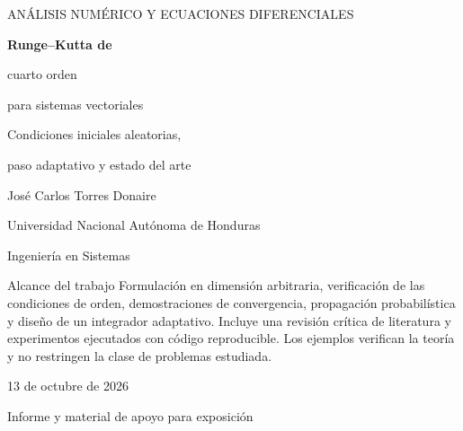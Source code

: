 \documentclass[11pt,a4paper]{article}
\theoremstyle{definition}\newtheorem{definition}[theorem]{Definición}
\theoremstyle{remark}\newtheorem{remark}[theorem]{Observación}
\begin{document}
\begin{titlepage}
\vspace*{1.2cm}
{\color{teal}\large ANÁLISIS NUMÉRICO Y ECUACIONES DIFERENCIALES}\par
\vspace{1.1cm}
{\color{navy}\fontsize{30}{35}\selectfont\bfseries Runge--Kutta de\par cuarto orden\par para sistemas vectoriales}\par
\vspace{0.65cm}
{\Large Condiciones iniciales aleatorias,\par paso adaptativo y estado del arte}\par
\vspace{1cm}
\par
\vspace{1.3cm}
{\large José Carlos Torres Donaire}\par
Universidad Nacional Autónoma de Honduras\par
Ingeniería en Sistemas\par
\vfill
\begin{keybox}{Alcance del trabajo}
Formulación en dimensión arbitraria, verificación de las condiciones de orden,
demostraciones de convergencia, propagación probabilística y diseño de un
integrador adaptativo. Incluye una revisión crítica de literatura y experimentos
ejecutados con código reproducible. Los ejemplos verifican la teoría y no
restringen la clase de problemas estudiada.
\end{keybox}
\vspace{0.5cm}
{\color{graytext}13 de octubre de 2026\par Informe y material de apoyo para exposición}
\end{titlepage}
\end{document}
